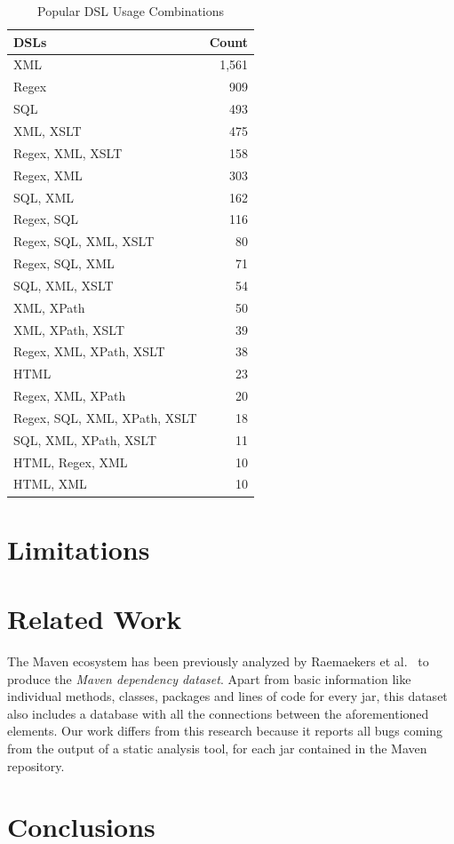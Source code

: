 \documentclass{sig-alternate}
\begin{document}
\begin{table}
\centering
\caption{Popular DSL Usage Combinations}
\label{tbl:dsl-top-usage}
\begin{tabular}{l r}
 \hline
\textbf{DSLs} & \textbf{Count}\\
\hline
XML & 1,561\\
Regex & 909\\
SQL & 493\\
XML, XSLT & 475\\
Regex, XML, XSLT & 158\\
Regex, XML & 303\\
SQL, XML & 162\\
Regex, SQL & 116\\
Regex, SQL, XML, XSLT & 80\\
Regex, SQL, XML & 71\\
SQL, XML, XSLT & 54\\
XML, XPath & 50\\
XML, XPath, XSLT & 39\\
Regex, XML, XPath, XSLT & 38\\
HTML & 23\\
Regex, XML, XPath & 20\\
Regex, SQL, XML, XPath, XSLT & 18\\
SQL, XML, XPath, XSLT & 11\\
HTML, Regex, XML & 10\\
HTML, XML & 10\\
\hline
\end{tabular}
\end{table}

\section{Limitations}
\label{sec:limit}


\section{Related Work}
\label{sec:rel}

The Maven ecosystem has been previously analyzed by Raemaekers et al.~\cite{RDV13} to produce the {\it Maven dependency dataset}. Apart from basic information like individual methods, classes, packages and lines of code for every {\sc jar}, this dataset also includes a database with all the connections between the aforementioned elements. Our work differs from this research because it reports all bugs coming from the output of a static analysis tool, for each {\sc jar} contained in the Maven repository.

\cite{MKLGS14} \cite{KARA14}

\section{Conclusions}
\label{sec:conc}




\end{document}
